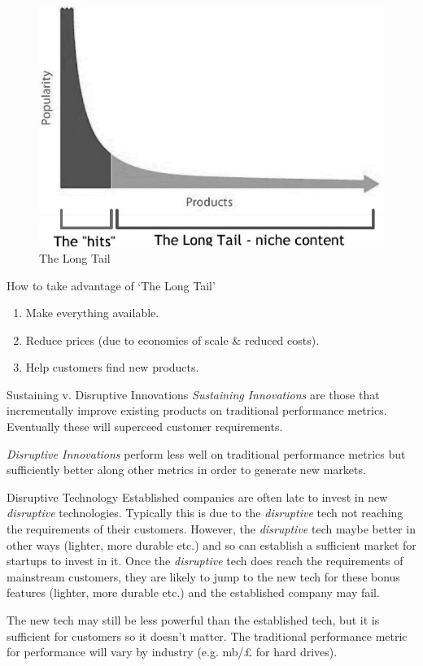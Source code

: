 \documentclass[11pt,a4paper]{article}
\begin{document}
\begin{figure}[ht!]
  \centering
  \includegraphics[width=.5\textwidth]{LongTail.jpg}
  \caption{The Long Tail}
\end{figure}

\begin{remark}{How to take advantage of `The Long Tail'}
  \begin{enumerate}
    \item Make everything available.
    \item Reduce prices (due to economies of scale \& reduced costs).
    \item Help customers find new products.
  \end{enumerate}
\end{remark}

\begin{remark}{Sustaining v. Disruptive Innovations}
  \textit{Sustaining Innovations} are those that incrementally improve existing products on traditional performance metrics. Eventually these will superceed customer requirements.
  \par \textit{Disruptive Innovations} perform less well on traditional performance metrics but sufficiently better along other metrics in order to generate new markets.
\end{remark}

\begin{proposition}{Disruptive Technology}
  Established companies are often late to invest in new \textit{disruptive} technologies. Typically this is due to the \textit{disruptive} tech not reaching the requirements of their customers. However, the \textit{disruptive} tech maybe better in other ways (lighter, more durable etc.) and so can establish a sufficient market for startups to invest in it. Once the \textit{disruptive} tech does reach the requirements of mainstream customers, they are likely to jump to the new tech for these bonus features (lighter, more durable etc.) and the established company may fail.
  \par The new tech may still be less powerful than the established tech, but it is sufficient for customers so it doesn't matter. The traditional performance metric for performance will vary by industry (e.g. mb/£ for hard drives).
\end{proposition}
\end{document}
